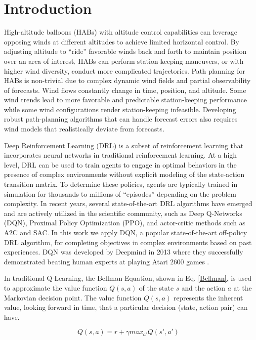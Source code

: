 \section{Introduction}\label{section:Introduction}

High-altitude balloons (HABs) with altitude control capabilities can leverage opposing winds at different altitudes to achieve limited horizontal control.  By adjusting altitude to ``ride'' favorable winds back and forth to maintain position over an area of interest, HABs can perform station-keeping maneuvers, or with higher wind diversity, conduct more complicated trajectories. Path planning for HABs is non-trivial due to complex dynamic wind fields and partial observability of forecasts.  Wind flows constantly change in time, position, and altitude.  Some wind trends lead to more favorable and predictable station-keeping performance while some wind configurations render station-keeping infeasible.  Developing robust path-planning algorithms that can handle forecast errors also requires wind models that realistically deviate from forecasts.

Deep Reinforcement Learning (DRL) is a subset of reinforcement learning that incorporates neural networks in traditional reinforcement learning. At a high level, DRL can be used to train agents to engage in optimal behaviors in the presence of complex environments without explicit modeling of the state-action transition matrix. To determine these policies, agents are typically trained in simulation for thousands to millions of ``episodes'' depending on the problem complexity. In recent years, several state-of-the-art DRL algorithms have emerged and are actively utilized in the scientific community, such as Deep Q-Networks (DQN), Proximal Policy Optimization (PPO), and actor-critic methods such as A2C and SAC. In this work we apply DQN, a popular state-of-the-art off-policy DRL algorithm,  for completing objectives in complex environments based on past experiences. DQN was developed by Deepmind in 2013 where they successfully demonstrated beating human experts at playing Atari 2600 games \cite{mnih2013playing}. 

In traditional Q-Learning, the Bellman Equation, shown in Eq. \ref{Bellman}, is used to approximate the value function $Q(s, a)$ of the state $s$ and the action $a$ at the Markovian decision point. The value function $Q(s, a)$ represents the inherent value, looking forward in time, that a particular decision (state, action pair) can have. 

\begin{equation}
    Q(s,a) = r + \gamma max_{a'}Q(s',a')
    \label{Bellman}
\end{equation}

